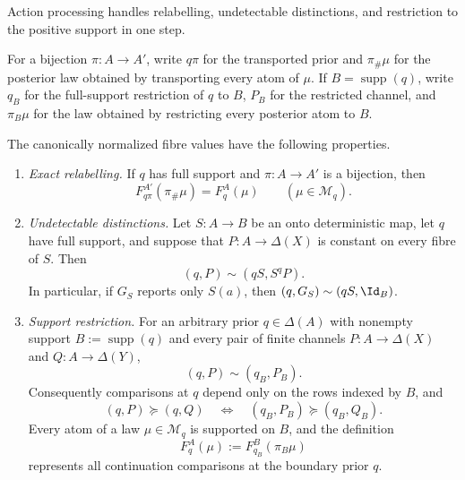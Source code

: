 Action processing handles relabelling, undetectable distinctions, and
restriction to the positive support in one step.

For a bijection $\pi:A\to A'$, write $q\pi$ for the transported prior and
$\pi_\#\mu$ for the posterior law obtained by transporting every atom of
$\mu$.  If $B=\operatorname{supp}(q)$, write $q_B$ for the full-support
restriction of $q$ to $B$, $P_B$ for the restricted channel, and
$\pi_B\mu$ for the law obtained by restricting every posterior atom to $B$.

\begin{lemma}
\label{pt:lem:transport}\label{pt:lem:actionbase}\label{pt:lem:neutrality}\label{pt:lem:supprestrict}
The canonically normalized fibre values have the following properties.

\begin{enumerate}[label=\textup{(\alph*)},leftmargin=*]
\item \emph{Exact relabelling.}
If $q$ has full support and $\pi:A\to A'$ is a bijection, then
\begin{equation}
 F_{q\pi}^{A'}(\pi_\#\mu)=F_q^A(\mu)
 \qquad(\mu\in\mathcal M_q).
 \label{pt:eq:exact-relabel}
\end{equation}

\item \emph{Undetectable distinctions.}
Let $S:A\to B$ be an onto deterministic map, let $q$ have full support, and
suppose that $P:A\to\Delta(X)$ is constant on every fibre of $S$.  Then
\begin{equation}
 (q,P)\sim(qS,S^qP).
 \label{pt:eq:undetectable}
\end{equation}
In particular, if $G_S$ reports only $S(a)$, then
$(q,G_S)\sim(qS,\Id_B)$.

\item \emph{Support restriction.}
For an arbitrary prior $q\in\Delta(A)$ with nonempty support
$B:=\operatorname{supp}(q)$ and every pair of finite channels
$P:A\to\Delta(X)$ and $Q:A\to\Delta(Y)$,
\begin{equation}
 (q,P)\sim(q_B,P_B).
 \label{pt:eq:support-indifference}
\end{equation}
Consequently comparisons at $q$ depend only on the rows indexed by $B$, and
\begin{equation}
 (q,P)\succeq(q,Q)
 \quad\Longleftrightarrow\quad
 (q_B,P_B)\succeq(q_B,Q_B).
 \label{pt:eq:support-comparison}
\end{equation}
Every atom of a law $\mu\in\mathcal M_q$ is supported on $B$, and the
definition
\begin{equation}
 F_q^A(\mu):=F_{q_B}^{B}(\pi_B\mu)
 \label{pt:eq:boundary-representative}
\end{equation}
represents all continuation comparisons at the boundary prior $q$.
\end{enumerate}
\end{lemma}

